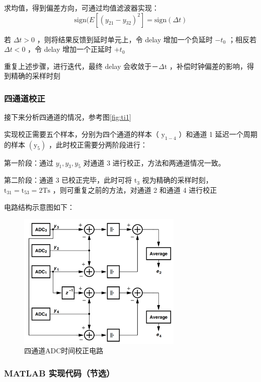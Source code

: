 \documentclass[cs4size,a4paper]{ctexart}
\numberwithin{equation}{section}
\numberwithin{table}{section}
\numberwithin{figure}{section}
\begin{document}
		\noindent
		求均值，得到偏差方向，可通过均值滤波器实现：
		\[
		\text{sign}(E[(y_{21} - y_{32})^2] = \text{sign}(\Delta t)
		\]
		
		若 $\Delta t>0$ ，则将结果反馈到延时单元上，令 delay 增加一个负延时 $-t_0$ ；相反若 $\Delta t<0$ ，令 delay 增加一个正延时 $+t_0$
		
		重复上述步骤，进行迭代，最终 delay 会收敛于－$\Delta \mathrm{t}$ ，补偿时钟偏差的影响，得到精确的采样时刻
		
		\subsubsection{四通道校正}
		接下来分析四通道的情况，参考图\ref{fig:ti1}

		实现校正需要五个样本，分别为四个通道的样本（ $\mathrm{y}_{1-4}$ ）和通道 1 延迟一个周期的样本 $\left(\mathrm{y}_5\right)$ ，此时校正需要分两阶段进行：
		
		第一阶段：通过 $y_1, y_3, y_5$ 对通道 3 进行校正，方法和两通道情况一致。
		
		第二阶段：通道 3 已校正完毕，此时可将 $\mathrm{t}_3$ 视为精确的采样时刻， $\mathrm{t}_{31}=\mathrm{t}_{53}=2 \mathrm{Ts}$ ，则可重复之前的方法，对通道 2 和通道 4 进行校正
		
		电路结构示意图如下：
		\begin{figure}[H]
			\centering
			\includegraphics[width=0.7\textwidth]{figure/ti2.png}
			\caption{四通道ADC时间校正电路} \label{fig:ti2}
		\end{figure}
		
		\subsubsection{MATLAB 实现代码（节选）}
		
\end{document}
